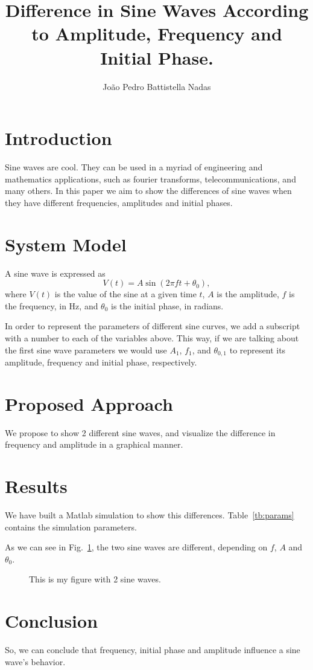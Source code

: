 \documentclass{IEEEtran}
\title{Difference in Sine Waves According to Amplitude, Frequency and Initial Phase.}
\author{João Pedro Battistella Nadas}
\begin{document}
\maketitle
\section{Introduction}
Sine waves are cool.
They can be used in a myriad of engineering and mathematics applications, such as fourier transforms, telecommunications, and many others. 
In this paper we aim to show the differences of sine waves when they have different frequencies, amplitudes and initial phases.

\section{System Model}
A sine wave is expressed as
\begin{equation}
    V(t) = A \sin(2\pi f t + \theta_0),
\end{equation}
where $V(t)$ is the value of the sine at a given time $t$, $A$ is the amplitude, $f$ is the frequency, in Hz, and $\theta_0$ is the initial phase, in radians.

In order to represent the parameters of different sine curves, we add a subscript with a number to each of the variables above. This way, if we are talking about the first sine wave parameters we would use $A_1$, $f_1$, and $\theta_{0,1}$ to represent its amplitude, frequency and initial phase, respectively.

\section{Proposed Approach}
We propose to show 2 different sine waves, and visualize the difference in frequency and amplitude in a graphical manner.

\section{Results}

We have built a Matlab simulation to show this differences. Table~\ref{tb:params} contains the simulation parameters.

\begin{table}[h!]
    
\end{table}

As we can see in Fig.~\ref{fig:sine_waves}, the two sine waves are different, depending on $f$, $A$ and $\theta_0$.

\begin{figure}[t!]
    \centering
    \resizebox{\columnwidth}{!}{}
    \caption{This is my figure with 2 sine waves.}\label{fig:sine_waves}
\end{figure}

\section{Conclusion}
So, we can conclude that frequency, initial phase and amplitude influence a sine wave's behavior.



\end{document}
